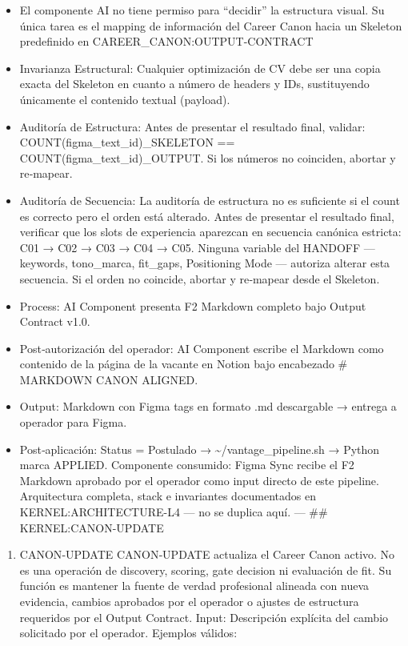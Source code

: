 \documentclass[
]{article}
\providecommand{\tightlist}{%
  \setlength{\itemsep}{0pt}\setlength{\parskip}{0pt}}
\begin{document}
\begin{itemize}
  gobernado por el Tag Registry activo. \#\#\# SKELETON‑INJECTION
  MAPPING (L1 LOGIC)
\item
  El componente AI no tiene permiso para ``decidir'' la estructura
  visual. Su única tarea es el mapping de información del Career Canon
  hacia un Skeleton predefinido en CAREER\_CANON:OUTPUT-CONTRACT
\item
  Invarianza Estructural: Cualquier optimización de CV debe ser una
  copia exacta del Skeleton en cuanto a número de headers y IDs,
  sustituyendo únicamente el contenido textual (payload).
\item
  Auditoría de Estructura: Antes de presentar el resultado final,
  validar: COUNT(figma\_text\_id)\_SKELETON ==
  COUNT(figma\_text\_id)\_OUTPUT. Si los números no coinciden, abortar y
  re‑mapear.
\item
  Auditoría de Secuencia: La auditoría de estructura no es suficiente si
  el count es correcto pero el orden está alterado. Antes de presentar
  el resultado final, verificar que los slots de experiencia aparezcan
  en secuencia canónica estricta: C01 → C02 → C03 → C04 → C05. Ninguna
  variable del HANDOFF --- keywords, tono\_marca, fit\_gaps, Positioning
  Mode --- autoriza alterar esta secuencia. Si el orden no coincide,
  abortar y re‑mapear desde el Skeleton.
\item
  Process: AI Component presenta F2 Markdown completo bajo Output
  Contract v1.0.
\item
  Post‑autorización del operador: AI Component escribe el Markdown como
  contenido de la página de la vacante en Notion bajo encabezado \#
  MARKDOWN CANON ALIGNED.
\item
  Output: Markdown con Figma tags en formato .md descargable → entrega a
  operador para Figma.
\item
  Post‑aplicación: Status = Postulado →
  \textasciitilde/vantage\_pipeline.sh → Python marca APPLIED.
  Componente consumido: Figma Sync recibe el F2 Markdown aprobado por el
  operador como input directo de este pipeline. Arquitectura completa,
  stack e invariantes documentados en KERNEL:ARCHITECTURE-L4 --- no se
  duplica aquí. --- \#\# KERNEL:CANON-UPDATE
\end{itemize}

\begin{enumerate}
\def\labelenumi{\arabic{enumi}.}
\tightlist
\item
  CANON‑UPDATE CANON‑UPDATE actualiza el Career Canon activo. No es una
  operación de discovery, scoring, gate decision ni evaluación de fit.
  Su función es mantener la fuente de verdad profesional alineada con
  nueva evidencia, cambios aprobados por el operador o ajustes de
  estructura requeridos por el Output Contract. Input: Descripción
  explícita del cambio solicitado por el operador. Ejemplos válidos:
\end{enumerate}
\end{document}
